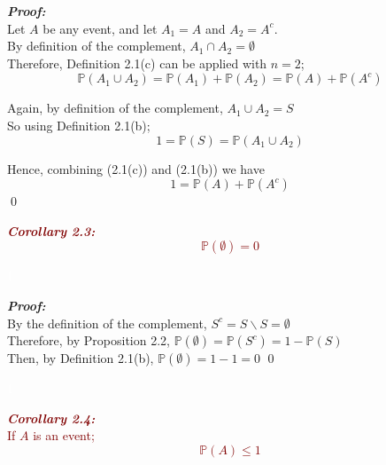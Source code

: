 \documentclass{report}
\newenvironment{cframedp}[1][Black]
  {\begin{tcolorbox}[colframe=#1,colback=white]}
  {\end{tcolorbox}}
\newenvironment{cframedprop}[1][Maroon]
  {\begin{tcolorbox}[colframe=#1,colback=white]}
  {\end{tcolorbox}}
\begin{document}
\begin{cframedp}

\textit{\textbf{Proof:}}\\
Let $A$ be any event, and let $A_1 = A$ and $A_2=A^c$.\\
By definition of the complement, $A_1 \cap A_2 = \emptyset$ \\

Therefore, Definition 2.1(c) can be applied with $n = 2$;
\begin{equation}
    \mathbb{P}(A_1 \cup A_2) = \mathbb{P}(A_1) + \mathbb{P}(A_2) = \mathbb{P}(A) + \mathbb{P}(A^c)
\end{equation}

Again, by definition of the complement, $A_1 \cup A_2 = S$\\
So using Definition 2.1(b);
\begin{equation}
    1 = \mathbb{P}(S) = \mathbb{P}(A_1 \cup A_2)
\end{equation}

Hence, combining (2.1(c)) and (2.1(b)) we have
\begin{equation}
    1 = \mathbb{P}(A) + \mathbb{P}(A^c)
\end{equation}
\qed
\end{cframedp}

\begin{cframedprop}

\textcolor{Maroon}{\textbf{\textit{Corollary 2.3:}}}\\
\textcolor{Maroon}{
\begin{equation}
    \mathbb{P}(\emptyset) = 0
\end{equation}}
\end{cframedprop}

\textcolor{White}{1}

\begin{cframedp}

\textit{\textbf{Proof:}}\\
By the definition of the complement, $S^c = S \backslash S = \emptyset$\\
Therefore, by Proposition 2.2, $\mathbb{P}(\emptyset) = \mathbb{P}(S^c) = 1 - \mathbb{P}(S)$\\
Then, by Definition 2.1(b), $ \mathbb{P}(\emptyset) = 1 - 1 = 0 $ 
\qed
\end{cframedp}

\textcolor{White}{1}

\begin{cframedprop}
\textcolor{Maroon}{\textbf{\textit{Corollary 2.4:}}}\\
\textcolor{Maroon}{If $A$ is an event;
\begin{equation}
    \mathbb{P}(A) \leq  1
\end{equation}}
\end{cframedprop}
\end{document}
